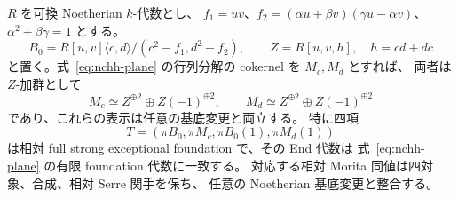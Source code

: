 \begin{lemma}
\label{lem:nc-relative-normal-tilting}
$R$ を可換 Noetherian $k$-代数とし、
$f_1=uv$、$f_2=(\alpha u+\beta v)(\gamma u-\alpha v)$、
$\alpha^2+\beta\gamma=1$ とする。
\[
 B_0=R[u,v]\langle c,d\rangle/(c^2-f_1,d^2-f_2),\qquad
 Z=R[u,v,h],\quad h=cd+dc
\]
と置く。式~\ref{eq:nchh-plane} の行列分解の cokernel を $M_c,M_d$ とすれば、
両者は $Z$-加群として
\[
 M_c\simeq Z^{\oplus2}\oplus Z(-1)^{\oplus2},\qquad
 M_d\simeq Z^{\oplus2}\oplus Z(-1)^{\oplus2}
\]
であり、これらの表示は任意の基底変更と両立する。
特に四項
\[
 T=(\pi B_0,\pi M_c,\pi B_0(1),\pi M_d(1))
\]
は相対 full strong exceptional foundation で、その End 代数は
式~\ref{eq:nchh-plane} の有限 foundation 代数に一致する。
対応する相対 Morita 同値は四対象、合成、相対 Serre 関手を保ち、
任意の Noetherian 基底変更と整合する。
\end{lemma}
